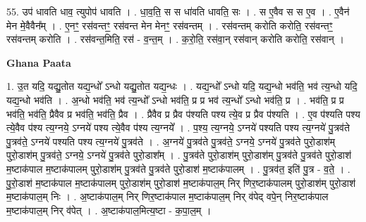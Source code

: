 \documentclass[17pt]{extarticle}
\begin{document}
55. उप॑ धावति धाव॒ त्युपोप॑ धावति । . धा॒व॒ति॒ स स धा॑वति धावति॒ सः । . स ए॒वैव स स ए॒व । . ए॒वैन॑ मेन मे॒वैवैन᳚म् । . ए॒नꣳ॒॒ रस॑वन्तꣳ॒॒ रस॑वन्त मेन मेनꣳ॒॒ रस॑वन्तम् । . रस॑वन्तम् करोति करोति॒ रस॑वन्तꣳ॒॒ रस॑वन्तम् करोति । . रस॑वन्त॒मिति॒ रस॑ - व॒न्त॒म् । . क॒रो॒ति॒ रस॑वा॒न् रस॑वान् करोति करोति॒ रस॑वान् । \newline

\textbf{Ghana Paata } \newline

1. उ॒त यदि॒ यद्यु॒तोत यद्य॒न्धो᳚ ऽन्धो यद्यु॒तोत यद्य॒न्धः । . यद्य॒न्धो᳚ ऽन्धो यदि॒ यद्य॒न्धो भव॑ति॒ भव॑ त्य॒न्धो यदि॒ यद्य॒न्धो भव॑ति । . अ॒न्धो भव॑ति॒ भव॑ त्य॒न्धो᳚ ऽन्धो भव॑ति॒ प्र प्र भव॑ त्य॒न्धो᳚ ऽन्धो भव॑ति॒ प्र । . भव॑ति॒ प्र प्र भव॑ति॒ भव॑ति॒ प्रैवैव प्र भव॑ति॒ भव॑ति॒ प्रैव । . प्रैवैव प्र प्रैव प॑श्यति पश्य त्ये॒व प्र प्रैव प॑श्यति । . ए॒व प॑श्यति पश्य त्ये॒वैव प॑श्य त्य॒ग्नये॒ ऽग्नये॑ पश्य त्ये॒वैव प॑श्य त्य॒ग्नये᳚ । . प॒श्य॒ त्य॒ग्नये॒ ऽग्नये॑ पश्यति पश्य त्य॒ग्नये॑ पु॒त्रव॑ते पु॒त्रव॑ते॒ ऽग्नये॑ पश्यति पश्य त्य॒ग्नये॑ पु॒त्रव॑ते । . अ॒ग्नये॑ पु॒त्रव॑ते पु॒त्रव॑ते॒ ऽग्नये॒ ऽग्नये॑ पु॒त्रव॑ते पुरो॒डाश॑म् पुरो॒डाश॑म् पु॒त्रव॑ते॒ ऽग्नये॒ ऽग्नये॑ पु॒त्रव॑ते पुरो॒डाश᳚म् । . पु॒त्रव॑ते पुरो॒डाश॑म् पुरो॒डाश॑म् पु॒त्रव॑ते पु॒त्रव॑ते पुरो॒डाश॑ म॒ष्टाक॑पाल म॒ष्टाक॑पालम् पुरो॒डाश॑म् पु॒त्रव॑ते पु॒त्रव॑ते पुरो॒डाश॑ म॒ष्टाक॑पालम् । . पु॒त्रव॑त॒ इति॑ पु॒त्र - व॒ते॒ । . पु॒रो॒डाश॑ म॒ष्टाक॑पाल म॒ष्टाक॑पालम् पुरो॒डाश॑म् पुरो॒डाश॑ म॒ष्टाक॑पाल॒म् निर् णिर॒ष्टाक॑पालम् पुरो॒डाश॑म् पुरो॒डाश॑ म॒ष्टाक॑पाल॒म् निः । . अ॒ष्टाक॑पाल॒म् निर् णिर॒ष्टाक॑पाल म॒ष्टाक॑पाल॒म् निर् व॑पेद् वपे॒न् निर॒ष्टाक॑पाल म॒ष्टाक॑पाल॒म् निर् व॑पेत् । . अ॒ष्टाक॑पाल॒मित्य॒ष्टा - क॒पा॒ल॒म् । \newline
\end{document}
